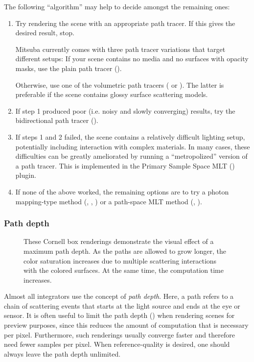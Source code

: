 The following ``algorithm'' may help to decide amongst the remaining ones:
\begin{enumerate}
\item Try rendering the scene with an appropriate path tracer. If this gives the desired result, stop.

Mitsuba currently comes with three path tracer variations that target different setups: If your
scene contains no media and no surfaces with opacity masks, use the plain path tracer ().

Otherwise, use one of the volumetric path tracers (
or ). The latter is preferable if the scene contains glossy surface scattering models.
\item If step 1 produced poor (i.e. noisy and slowly converging) results, try
the bidirectional path tracer ().
\item If steps 1 and 2 failed, the scene contains a relatively difficult lighting setup, potentially
including interaction with complex materials.
In many cases, these difficulties can be greatly ameliorated by running a ``metropolized'' version
of a path tracer. This is implemented in the Primary Sample Space MLT () plugin.
\item If none of the above worked, the remaining options are to try a photon mapping-type
method (, , ) or a path-space MLT
method (, ).
\end{enumerate}

\subsubsection*{Path depth}
\begin{figure}[htb!]
\centering
\hfill
{}
\caption{
	\label{fig:pathdepths}
	These Cornell box renderings demonstrate the visual
	effect of a maximum path depth. As the paths
	are allowed to grow longer, the color saturation
	increases due to multiple scattering interactions
	with the colored surfaces. At the same time, the
	computation time increases.
}
\end{figure}

Almost all integrators use the concept of \emph{path depth}.
Here, a path refers to a chain of scattering events that
starts at the light source and ends at the eye or sensor.
It is often useful to limit the path depth ()
when rendering scenes for preview purposes, since this reduces the amount
of computation that is necessary per pixel. Furthermore, such renderings
usually converge faster and therefore need fewer samples per pixel.
When reference-quality is desired, one should always leave the path
depth unlimited.

